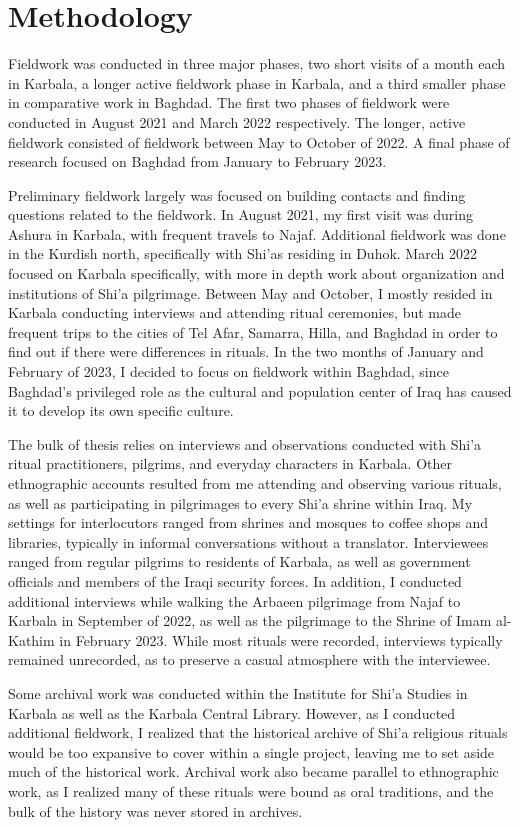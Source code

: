 \section{Methodology}
Fieldwork was conducted in three major phases, two short visits of a month each in Karbala, a longer active fieldwork phase in Karbala, and a third smaller phase in comparative work in Baghdad. The first two phases of fieldwork were conducted in August 2021 and March 2022 respectively. The longer, active fieldwork consisted of fieldwork between May to October of 2022. A final phase of research focused on Baghdad from January to February 2023. 

Preliminary fieldwork largely was focused on building contacts and finding questions related to the fieldwork. In August 2021, my first visit was during Ashura in Karbala, with frequent travels to Najaf. Additional fieldwork was done in the Kurdish north, specifically with Shi'as residing in Duhok. March 2022 focused on Karbala specifically, with more in depth work about organization and institutions of Shi'a pilgrimage. Between May and October, I mostly resided in Karbala conducting interviews and attending ritual ceremonies, but made frequent trips to the cities of Tel Afar, Samarra, Hilla, and Baghdad in order to find out if there were differences in rituals. In the two months of January and February of 2023, I decided to focus on fieldwork within Baghdad, since Baghdad's privileged role as the cultural and population center of Iraq has caused it to develop its own specific culture. 

The bulk of thesis relies on interviews and observations conducted with Shi'a ritual practitioners, pilgrims, and everyday characters in Karbala. Other ethnographic accounts resulted from me attending and observing various rituals, as well as participating in pilgrimages to every Shi'a shrine within Iraq. My settings for interlocutors ranged from shrines and mosques to coffee shops and libraries, typically in informal conversations without a translator. Interviewees ranged from regular pilgrims to residents of Karbala, as well as government officials and members of the Iraqi security forces. In addition, I conducted additional interviews while walking the Arbaeen pilgrimage from Najaf to Karbala in September of 2022, as well as the pilgrimage to the Shrine of Imam al-Kathim in February 2023. While most rituals were recorded, interviews typically remained unrecorded, as to preserve a casual atmosphere with the interviewee. 

Some archival work was conducted within the Institute for Shi'a Studies in Karbala as well as the Karbala Central Library. However, as I conducted additional fieldwork, I realized that the historical archive of Shi'a religious rituals would be too expansive to cover within a single project, leaving me to set aside much of the historical work. Archival work also became parallel to ethnographic work, as I realized many of these rituals were bound as oral traditions, and the bulk of the history was never stored in archives. 

